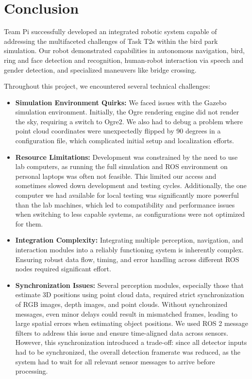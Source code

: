 \documentclass[a4paper]{article}
\begin{document}
\section{Conclusion}
Team Pi successfully developed an integrated robotic system capable of addressing the multifaceted challenges of Task T2s within the bird park simulation. Our robot demonstrated capabilities in autonomous navigation, bird, ring and face detection and recognition, human-robot interaction via speech and gender detection, and specialized maneuvers like bridge crossing.

Throughout this project, we encountered several technical challenges:
\begin{itemize}
    \item \textbf{Simulation Environment Quirks:} We faced issues with the Gazebo simulation environment. Initially, the Ogre rendering engine did not render the sky, requiring a switch to Ogre2. We also had to debug a problem where point cloud coordinates were unexpectedly flipped by 90 degrees in a configuration file, which complicated initial setup and localization efforts.

    \item \textbf{Resource Limitations:} Development was constrained by the need to use lab computers, as running the full simulation and ROS environment on personal laptops was often not feasible. This limited our access and sometimes slowed down development and testing cycles. Additionally, the one computer we had available for local testing was significantly more powerful than the lab machines, which led to compatibility and performance issues when switching to less capable systems, as configurations were not optimized for them.

    \item \textbf{Integration Complexity:} Integrating multiple perception, navigation, and interaction modules into a reliably functioning system is inherently complex. Ensuring robust data flow, timing, and error handling across different ROS nodes required significant effort.

    \item \textbf{Synchronization Issues:} Several perception modules, especially those that estimate 3D positions using point cloud data, required strict synchronization of RGB images, depth images, and point clouds. Without synchronized messages, even minor delays could result in mismatched frames, leading to large spatial errors when estimating object positions. We used ROS 2 message filters to address this issue and ensure time-aligned data across sensors. However, this synchronization introduced a trade-off: since all detector inputs had to be synchronized, the overall detection framerate was reduced, as the system had to wait for all relevant sensor messages to arrive before processing.

\end{itemize}
\end{document}
